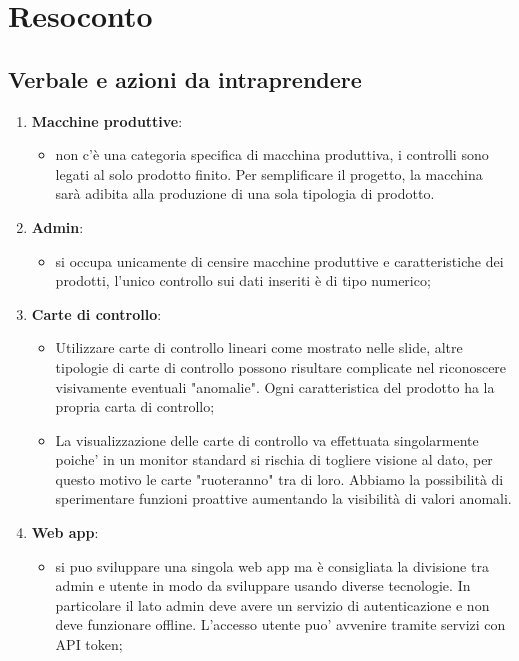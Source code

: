 \section{Resoconto}
\subsection{Verbale e azioni da intraprendere}

\begin{enumerate}
	\item \textbf{Macchine produttive}:
		\begin{itemize}
			\item non c'è una categoria specifica di macchina produttiva, i controlli sono legati al  solo prodotto finito. Per semplificare il progetto, la macchina sarà adibita alla produzione di una sola tipologia di prodotto.
		\end{itemize}
	\item \textbf{Admin}:
		\begin{itemize}
			\item si occupa unicamente di censire macchine produttive e caratteristiche dei prodotti, l'unico controllo sui dati inseriti è di tipo numerico;
		\end{itemize}
	\item \textbf{Carte di controllo}:
		\begin{itemize}
			\item Utilizzare carte di controllo lineari come mostrato nelle slide, altre tipologie di carte di controllo possono risultare complicate nel riconoscere visivamente eventuali "anomalie". Ogni caratteristica del prodotto ha la propria carta di controllo;
			\item La visualizzazione delle carte di controllo va effettuata singolarmente poiche' in un monitor standard si rischia di togliere visione al dato, per questo motivo le carte "ruoteranno" tra di loro. Abbiamo la possibilità di sperimentare funzioni proattive aumentando la visibilità di valori anomali.
		\end{itemize}
	\item \textbf{Web app}:
		\begin{itemize}
			\item si puo sviluppare una singola web app ma è consigliata la divisione tra admin e utente in modo da sviluppare usando diverse tecnologie. In particolare il lato admin deve avere un servizio di autenticazione e non deve funzionare offline. L'accesso utente puo' avvenire tramite servizi con API token;

\end{itemize}
\end{enumerate}

